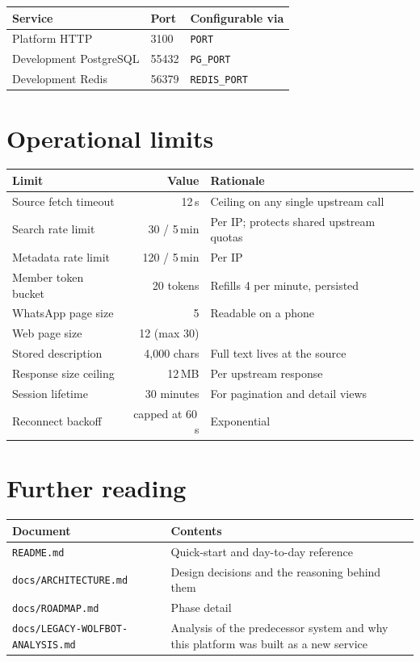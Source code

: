 \documentclass[11pt,a4paper]{report}
\begin{document}
\begin{center}
\begin{tabular}{@{}lll@{}}
\toprule
\textbf{Service} & \textbf{Port} & \textbf{Configurable via} \\
\midrule
Platform HTTP & 3100 & \texttt{PORT} \\
Development PostgreSQL & 55432 & \texttt{PG\_PORT} \\
Development Redis & 56379 & \texttt{REDIS\_PORT} \\
\bottomrule
\end{tabular}
\end{center}

\section{Operational limits}

\begin{center}
\begin{tabularx}{\textwidth}{@{}lrX@{}}
\toprule
\textbf{Limit} & \textbf{Value} & \textbf{Rationale} \\
\midrule
Source fetch timeout & 12\,s & Ceiling on any single upstream call \\
Search rate limit & 30 / 5\,min & Per IP; protects shared upstream quotas \\
Metadata rate limit & 120 / 5\,min & Per IP \\
Member token bucket & 20 tokens & Refills 4 per minute, persisted \\
WhatsApp page size & 5 & Readable on a phone \\
Web page size & 12 (max 30) & \\
Stored description & 4{,}000 chars & Full text lives at the source \\
Response size ceiling & 12\,MB & Per upstream response \\
Session lifetime & 30 minutes & For pagination and detail views \\
Reconnect backoff & capped at 60\,s & Exponential \\
\bottomrule
\end{tabularx}
\end{center}

\section{Further reading}

\begin{center}
\begin{tabularx}{\textwidth}{@{}lX@{}}
\toprule
\textbf{Document} & \textbf{Contents} \\
\midrule
\texttt{README.md} & Quick-start and day-to-day reference \\
\texttt{docs/ARCHITECTURE.md} & Design decisions and the reasoning behind them \\
\texttt{docs/ROADMAP.md} & Phase detail \\
\texttt{docs/LEGACY-WOLFBOT-ANALYSIS.md} & Analysis of the predecessor system
and why this platform was built as a new service \\
\bottomrule
\end{tabularx}
\end{center}
\end{document}
